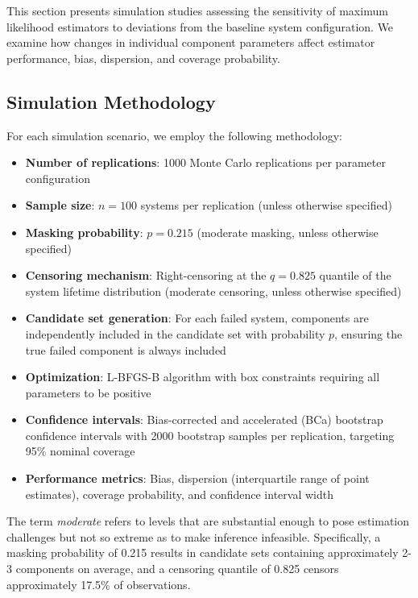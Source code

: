 \documentclass[11pt]{article}
\begin{document}
This section presents simulation studies assessing the sensitivity of maximum likelihood estimators to deviations from the baseline system configuration. We examine how changes in individual component parameters affect estimator performance, bias, dispersion, and coverage probability.

\subsection{Simulation Methodology}

For each simulation scenario, we employ the following methodology:
\begin{itemize}
\item \textbf{Number of replications}: 1000 Monte Carlo replications per parameter configuration
\item \textbf{Sample size}: $n = 100$ systems per replication (unless otherwise specified)
\item \textbf{Masking probability}: $p = 0.215$ (moderate masking, unless otherwise specified)
\item \textbf{Censoring mechanism}: Right-censoring at the $q = 0.825$ quantile of the system lifetime distribution (moderate censoring, unless otherwise specified)
\item \textbf{Candidate set generation}: For each failed system, components are independently included in the candidate set with probability $p$, ensuring the true failed component is always included
\item \textbf{Optimization}: L-BFGS-B algorithm \cite{byrd1995} with box constraints requiring all parameters to be positive
\item \textbf{Confidence intervals}: Bias-corrected and accelerated (BCa) bootstrap confidence intervals \cite{efron1987better} with 2000 bootstrap samples per replication, targeting 95\% nominal coverage
\item \textbf{Performance metrics}: Bias, dispersion (interquartile range of point estimates), coverage probability, and confidence interval width
\end{itemize}

The term \emph{moderate} refers to levels that are substantial enough to pose estimation challenges but not so extreme as to make inference infeasible. Specifically, a masking probability of 0.215 results in candidate sets containing approximately 2-3 components on average, and a censoring quantile of 0.825 censors approximately 17.5\% of observations.
\end{document}
